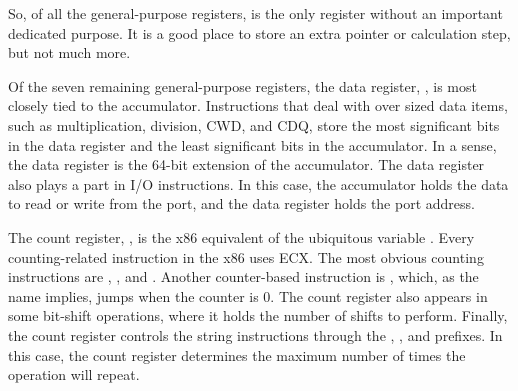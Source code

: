 \begin{description}
  So, of all the general-purpose registers,  is the only register without an
  important dedicated purpose. It is a good place to store an extra pointer or calculation
  step, but not much more.
\item[\code{EDX}] Of the seven remaining general-purpose registers, the data register,
  , is most closely tied to the accumulator. Instructions that deal with over
  sized data items, such as multiplication, division, CWD, and CDQ, store the most
  significant bits in the data register and the least significant bits in the
  accumulator. In a sense, the data register is the 64-bit extension of the
  accumulator. The data register also plays a part in I/O instructions. In this case, the
  accumulator holds the data to read or write from the port, and the data register holds
  the port address.
\item[\code{ECX}] The count register, , is the x86 equivalent of the ubiquitous
  variable . Every counting-related instruction in the x86 uses ECX. The most
  obvious counting instructions are , , and . Another
  counter-based instruction is , which, as the name implies, jumps when the
  counter is 0. The count register also appears in some bit-shift operations, where it
  holds the number of shifts to perform. Finally, the count register controls the string
  instructions through the , , and  prefixes. In this
  case, the count register determines the maximum number of times the operation will
  repeat.


\end{description}
